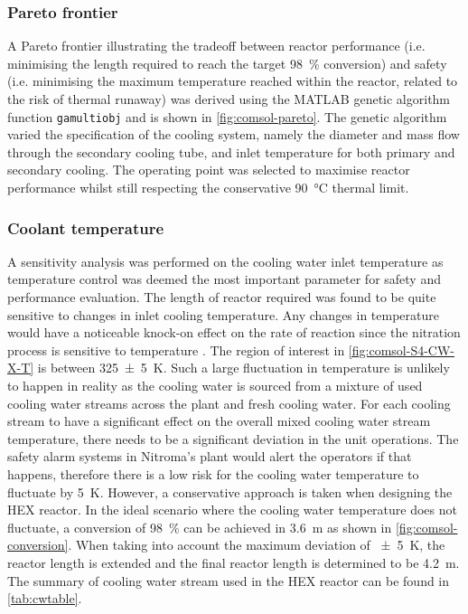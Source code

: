 \subsubsection{Pareto frontier}
A Pareto frontier illustrating the tradeoff between reactor performance (i.e. minimising the length required to reach the target \SI{98}{\percent} conversion) and safety (i.e. minimising the maximum temperature reached within the reactor, related to the risk of thermal runaway) was derived using the MATLAB genetic algorithm function \texttt{gamultiobj} and is shown in \cref{fig:comsol-pareto}. The genetic algorithm varied the specification of the cooling system, namely the diameter and mass flow through the secondary cooling tube, and inlet temperature for both primary and secondary cooling. The operating point was selected to maximise reactor performance whilst still respecting the conservative \SI{90}{\celsius} thermal limit.

\subsubsection{Coolant temperature}
\label{sec:coolanttemp}
A sensitivity analysis was performed on the cooling water inlet temperature as temperature control was deemed the most important parameter for safety and performance evaluation. The length of reactor required was found to be quite sensitive to changes in inlet cooling temperature. Any changes in temperature would have a noticeable knock-on effect on the rate of reaction since the nitration process is sensitive to temperature \cite{chen_experimental_1998}. The region of interest in \cref{fig:comsol-S4-CW-X-T} is between \SI{325+-5}{\K}. Such a large fluctuation in temperature is unlikely to happen in reality as the cooling water is sourced from a mixture of used cooling water streams across the plant and fresh cooling water. For each cooling stream to have a significant effect on the overall mixed cooling water stream temperature, there needs to be a significant deviation in the unit operations. The safety alarm systems in Nitroma's plant would alert the operators if that happens, therefore there is a low risk for the cooling water temperature to fluctuate by \pm \SI{5}{\K}. However, a conservative approach is taken when designing the HEX reactor. In the ideal scenario where the cooling water temperature does not fluctuate, a conversion of \SI{98}{\percent} can be achieved in \SI{3.6}{\m} as shown in \cref{fig:comsol-conversion}. When taking into account the maximum deviation of \SI{+-5}{\K}, the reactor length is extended and the final reactor length is determined to be \SI{4.2}{\metre}. The summary of cooling water stream used in the HEX reactor can be found in \cref{tab:cwtable}.

